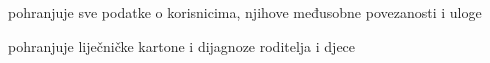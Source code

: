 \begin{packed_enum}
\begin{packed_enum}
				\end{packed_enum}
				
				\item  {}
				
				\begin{packed_enum}
					
					\item pohranjuje sve podatke o korisnicima, njihove međusobne povezanosti i uloge
					\item pohranjuje liječničke kartone i dijagnoze roditelja i djece
					
				\end{packed_enum}
				
			\end{packed_enum}
			
			\eject 
			
			
				
